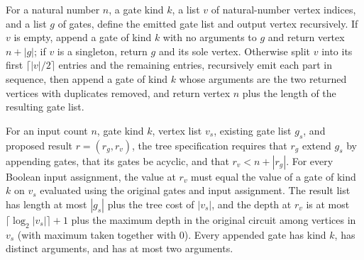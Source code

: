 \begin{definition}
\label{BoolCircuit.emitTree}
\leanok
{}
For a natural number $n$, a gate kind $k$, a list $v$ of natural-number vertex indices,
and a list $g$ of gates, define the emitted gate list and output vertex recursively. If
$v$ is empty, append a gate of kind $k$ with no arguments to $g$ and return vertex
$n+|g|$; if $v$ is a singleton, return $g$ and its sole vertex. Otherwise split $v$ into
its first $\lceil |v|/2\rceil$ entries and the remaining entries, recursively emit each
part in sequence, then append a gate of kind $k$ whose arguments are the two returned
vertices with duplicates removed, and return vertex $n$ plus the length of the resulting
gate list.
\end{definition}

\begin{definition}
\label{BoolCircuit.TreeSpec}
\leanok
{}
For an input count $n$, gate kind $k$, vertex list $v_s$, existing gate list $g_s$, and
proposed result $r=(r_g,r_v)$, the tree specification requires that $r_g$ extend $g_s$
by appending gates, that its gates be acyclic, and that $r_v<n+|r_g|$. For every Boolean
input assignment, the value at $r_v$ must equal the value of a gate of kind $k$ on $v_s$
evaluated using the original gates and input assignment. The result list has length at
most $|g_s|$ plus the tree cost of $|v_s|$, and the depth at $r_v$ is at most
$\lceil\log_2 |v_s|\rceil+1$ plus the maximum depth in the original circuit among
vertices in $v_s$ (with maximum taken together with $0$). Every appended gate has kind
$k$, has distinct arguments, and has at most two arguments.
\end{definition}

